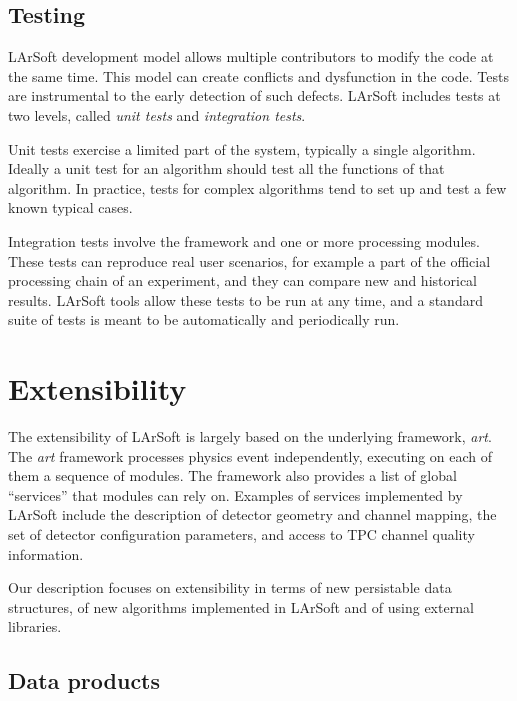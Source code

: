 

\subsection{Testing}\label{testing}

LArSoft development model allows multiple contributors to modify the
code at the same time. This model can create conflicts and dysfunction
in the code. Tests are instrumental to the early detection of such
defects. LArSoft includes tests at two levels, called \emph{unit tests}
and \emph{integration tests}.

Unit tests exercise a limited part of the system, typically a single
algorithm. Ideally a unit test for an algorithm should test all the
functions of that algorithm. In practice, tests for complex algorithms
tend to set up and test a few known typical cases.

Integration tests involve the framework and one or more processing
modules. These tests can reproduce real user scenarios, for example a
part of the official processing chain of an experiment, and they can
compare new and historical results. LArSoft tools allow these tests to
be run at any time, and a standard suite of tests is meant to be
automatically and periodically run.

\section{Extensibility}\label{extensibility}

The extensibility of LArSoft is largely based on the underlying
framework, \emph{art}. The \emph{art} framework processes physics event
independently, executing on each of them a sequence of modules. The
framework also provides a list of global ``services'' that modules can
rely on. Examples of services implemented by LArSoft include the
description of detector geometry and channel mapping, the set of
detector configuration parameters, and access to TPC channel quality
information.

Our description focuses on extensibility in terms of new persistable
data structures, of new algorithms implemented in LArSoft and of using
external libraries.

\subsection{Data products}\label{data-products}


